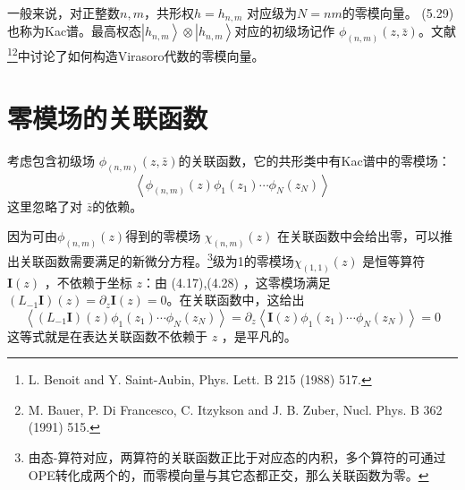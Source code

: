 一般来说，对正整数$ n,m $，共形权$ h=h_{n,m}$ 对应级为$ N=nm $的零模向量。 (5.29) 也称为Kac谱。最高权态$ \left|h_{n, m}\right\rangle \otimes\left|h_{n, m}\right\rangle $对应的初级场记作 $\phi_{(n, m)}(z, \bar{z}) $。文献\footnote{L. Benoit and Y. Saint-Aubin, Phys. Lett. B 215 (1988) 517.}\footnote{M. Bauer, P. Di Francesco, C. Itzykson and J. B. Zuber, Nucl. Phys. B 362 (1991) 515.}中讨论了如何构造Virasoro代数的零模向量。

\section{零模场的关联函数}
考虑包含初级场 $\phi_{(n, m)}(z, \bar{z}) $的关联函数，它的共形类中有Kac谱中的零模场：
$$
\left\langle\phi_{(n, m)}(z) \phi_{1}\left(z_{1}\right) \cdots \phi_{N}\left(z_{N}\right)\right\rangle
$$
这里忽略了对 $\bar{z} $的依赖。

因为可由$ \phi_{(n, m)}(z) $得到的零模场 $\chi_{(n, m)}(z)$ 在关联函数中会给出零，可以推出关联函数需要满足的新微分方程。\footnote{由态-算符对应，两算符的关联函数正比于对应态的内积，多个算符的可通过OPE转化成两个的，而零模向量与其它态都正交，那么关联函数为零。}级为1的零模场$ \chi_{(1,1)}(z)$ 是恒等算符 $\boldsymbol{I}(z)$ ，不依赖于坐标 $z $：由 (4.17),(4.28) ，这零模场满足 $\left(L_{-1} \boldsymbol{I}\right)(z)=\partial_{z} \boldsymbol{I}(z)=0$。在关联函数中，这给出
$$
\left\langle\left(L_{-1} \boldsymbol{I}\right)(z) \phi_{1}\left(z_{1}\right) \cdots \phi_{N}\left(z_{N}\right)\right\rangle=\partial_{z}\left\langle\boldsymbol{I}(z) \phi_{1}\left(z_{1}\right) \cdots \phi_{N}\left(z_{N}\right)\right\rangle=0
$$
这等式就是在表达关联函数不依赖于 $z$ ，是平凡的。

